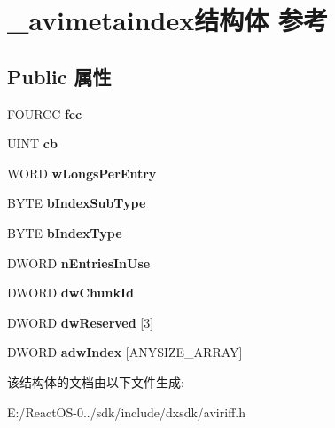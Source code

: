 \hypertarget{struct__avimetaindex}{}\section{\+\_\+avimetaindex结构体 参考}
\label{struct__avimetaindex}
\subsection*{Public 属性}
\begin{DoxyCompactItemize}
\item 
\mbox{\label{struct__avimetaindex_afe12b4dd480a67586689eda9ebd3d2a5}} 
F\+O\+U\+R\+CC {\bfseries fcc}
\item 
\mbox{\label{struct__avimetaindex_a2d91d4ba7959035eb3698b370f99e27d}} 
U\+I\+NT {\bfseries cb}
\item 
\mbox{\label{struct__avimetaindex_a7a68248260e9b9078fce1f472bf87775}} 
W\+O\+RD {\bfseries w\+Longs\+Per\+Entry}
\item 
\mbox{\label{struct__avimetaindex_a7e1fb7462ab5e89acf599a31a686c71a}} 
B\+Y\+TE {\bfseries b\+Index\+Sub\+Type}
\item 
\mbox{\label{struct__avimetaindex_a85cbf9600f9884f779b1ea1a70c1d7e5}} 
B\+Y\+TE {\bfseries b\+Index\+Type}
\item 
\mbox{\label{struct__avimetaindex_a317b7fffc5c653791770c4c451fd09fc}} 
D\+W\+O\+RD {\bfseries n\+Entries\+In\+Use}
\item 
\mbox{\label{struct__avimetaindex_aace27ef03b689f5ae3e865a9514cd219}} 
D\+W\+O\+RD {\bfseries dw\+Chunk\+Id}
\item 
\mbox{\label{struct__avimetaindex_a5148e867e26b586dc36ca13cdc87833c}} 
D\+W\+O\+RD {\bfseries dw\+Reserved} \mbox{[}3\mbox{]}
\item 
\mbox{\label{struct__avimetaindex_a67ad8cde87af40d0282df92926a5b266}} 
D\+W\+O\+RD {\bfseries adw\+Index} \mbox{[}A\+N\+Y\+S\+I\+Z\+E\+\_\+\+A\+R\+R\+AY\mbox{]}
\end{DoxyCompactItemize}


该结构体的文档由以下文件生成\+:\begin{DoxyCompactItemize}
\item 
E\+:/\+React\+O\+S-\/0../sdk/include/dxsdk/aviriff.\+h\end{DoxyCompactItemize}
